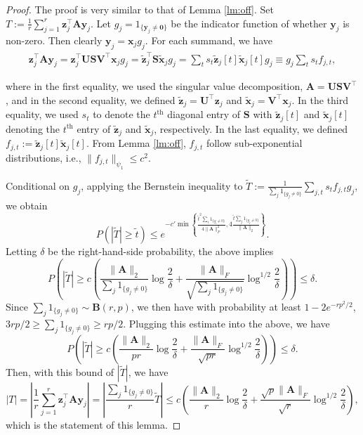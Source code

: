 \documentclass[10pt,a4paper]{amsart}
\newcommand{\B}{\mathbf}
\begin{document}
\begin{proof}
The proof is very similar to that of Lemma \ref{lm:off}. Set $T:= \frac{1}{r} \sum\limits_{j=1}^{r} \B{z}_j^{\top}\B{A}\B{y}_j $. Let $g_j=1_{\{\B{y}_j \neq \B{0}\}}$ be the indicator function of whether $\B{y}_j$ is non-zero. Then clearly $\B{y}_j=\B{x}_j g_j$. For each summand, we have
\begin{align}
\B{z}_j^{\top}\B{A}\B{y}_j = \B{z}_j^{\top}\B{U}\B{S}\B{V}^{\top}\B{x}_j g_j = \tilde{\B{z}}_j^{\top}\B{S}\tilde{\B{x}}_j g_j = \sum_t s_t \tilde{\B{z}}_j[t]\tilde{\B{x}}_j[t] g_j\equiv g_j\sum_t s_t f_{j,t},
\end{align}

where in the first equality, we used the singular value decomposition, $\B{A}=\B{U}\B{S}\B{V}^{\top}$, and in the second equality, we defined $\tilde{\B{z}}_j = \B{U}^{\top}\B{z}_j$ and $\tilde{\B{x}}_j = \B{V}^{\top} \B{x}_j$. In the third equality, we used $s_t$ to denote the $t^\text{th}$ diagonal entry of $\B{S}$ with $\tilde{\B{z}}_j[t]$ and $\tilde{\B{x}}_j[t]$ denoting the $t^\text{th}$ entry of $\tilde{\B{z}}_j$ and $\tilde{\B{x}}_j$, respectively. In the last equality, we defined $f_{j,t}:=\tilde{\B{z}}_j[t]\tilde{\B{x}}_j[t]$.
From Lemma \ref{lm:off}, $f_{j,t}$ follow sub-exponential distributions, i.e.,
$\|f_{j,t}\|_{\psi_1} \leq c^2$.

Conditional on $g_j$, applying the Bernstein inequality to $\tilde{T}:= \frac{1}{\sum_j 1_{\{g_j\neq 0\}} }\sum_{j,t} s_t f_{j,t} g_j$, we obtain
\[
 P(| \tilde{T}| \geq \tilde{t}) \leq e^{-c'\min\left\{ \frac{\tilde{t}^2\sum_i 1_{\{g_i\neq 0\}}}{4\|\B{A}\|_F^2}, 4\frac{\tilde{t}\sum_j 1_{\{g_j\neq 0\}} }{ \|\B{A}\|_2}\right\}}.
\]
Letting $\delta$ be the right-hand-side probability, the above implies
\[
 P\left(| \tilde{T}| \geq c \left( \frac{\|\B{A}\|_2}{\sum_j 1_{\{g_j\neq 0\}} }\log \frac{2}{\delta} + \frac{\|\B{A}\|_F}{\sqrt {\sum_j 1_{\{g_j\neq 0\}} }}\log^{1/2} \frac{2}{\delta}\right)\right) \leq \delta.
\]
 Since $\sum_j 1_{\{g_j\neq 0\}}\sim \B{B}(r,p)$, we then have with probability at least $1-2e^{-rp^2/2}$, $3rp/2\geq \sum_j 1_{\{g_j\neq 0\}} \geq rp/2$. Plugging this estimate into the above, we have
 \[
 P\left(| \tilde{T}| \geq c \left( \frac{\|\B{A}\|_2}{pr }\log \frac{2}{\delta} + \frac{\|\B{A}\|_F}{\sqrt {pr }}\log^{1/2} \frac{2}{\delta}\right)\right) \leq \delta.
\]
Then, with this bound of $|\tilde{T}|$, we have
\[
|T| = \left|\frac{1}{r} \sum\limits_{j=1}^{r} \B{z}_j^{\top}\B{A}\B{y}_j \right| = \left|\frac{ \sum_j 1_{\{g_j\neq 0\}}}{r} \tilde{T}\right|\leq c\left( \frac{\|\B{A}\|_2}{r }\log \frac{2}{\delta} + \frac{\sqrt p \|\B{A}\|_F}{\sqrt {r }}\log^{1/2} \frac{2}{\delta}\right),
\]
which is the statement of this lemma.
\end{proof}
\end{document}
